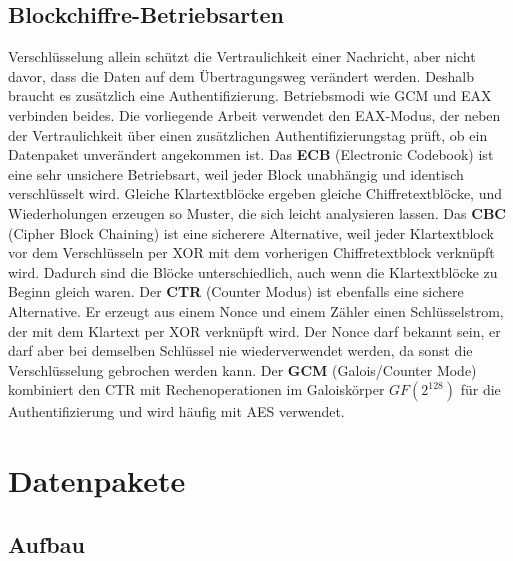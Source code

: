 \subsection{Blockchiffre-Betriebsarten}

Verschlüsselung allein schützt die Vertraulichkeit einer Nachricht, aber nicht davor, dass die Daten auf dem Übertragungsweg verändert werden. Deshalb braucht es zusätzlich eine Authentifizierung. Betriebsmodi wie GCM und EAX verbinden beides.\citep{GaloisCounterMode2025,EAXModus2021} Die vorliegende Arbeit verwendet den EAX-Modus, der neben der Vertraulichkeit über einen zusätzlichen Authentifizierungstag prüft, ob ein Datenpaket unverändert angekommen ist.
Das \textbf{ECB} (Electronic Codebook) ist eine sehr unsichere Betriebsart, weil jeder Block unabhängig und identisch verschlüsselt wird.\citep{BlockchiffrenBlockCipher} Gleiche Klartextblöcke ergeben gleiche Chiffretextblöcke, und Wiederholungen erzeugen so Muster, die sich leicht analysieren lassen.
Das \textbf{CBC} (Cipher Block Chaining) ist eine sicherere Alternative, weil jeder Klartextblock vor dem Verschlüsseln per XOR mit dem vorherigen Chiffretextblock verknüpft wird. Dadurch sind die Blöcke unterschiedlich, auch wenn die Klartextblöcke zu Beginn gleich waren.
Der \textbf{CTR} (Counter Modus) ist ebenfalls eine sichere Alternative. Er erzeugt aus einem Nonce und einem Zähler einen Schlüsselstrom, der mit dem Klartext per XOR verknüpft wird. Der Nonce darf bekannt sein, er darf aber bei demselben Schlüssel nie wiederverwendet werden, da sonst die Verschlüsselung gebrochen werden kann.
Der \textbf{GCM} (Galois/Counter Mode) kombiniert den CTR mit Rechenoperationen im Galoiskörper \(GF(2^{128})\) für die Authentifizierung und wird häufig mit AES verwendet.\citep{GaloisCounterMode2025}

\section{Datenpakete}

\subsection{Aufbau}

